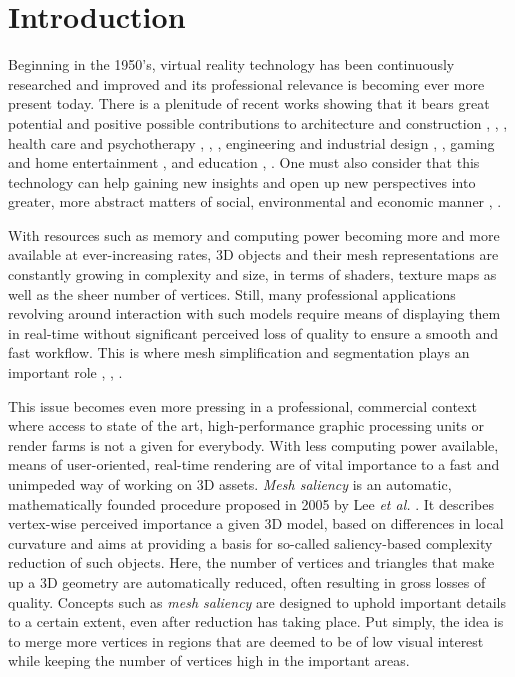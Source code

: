\chapter{Introduction}
\label{sec:introduction}

Beginning in the 1950's, virtual reality technology \cite{steuer1992defining} has been continuously researched and improved and its professional relevance is becoming ever more present today. There is a plenitude of recent works showing that it bears great potential and positive possible contributions to architecture and construction \cite{sampaio2014application}, \cite{le2015social}, \cite{stouffs2013happening}, health care and psychotherapy \cite{baus2014moving}, \cite{merians2014rehabilitation}, \cite{de2014healthcare}, engineering and industrial design \cite{marks2014towards}, \cite{wendrich2016hybrid}, gaming and home entertainment \cite{valente2016live}, \cite{zyda2005visual} and education \cite{merchant2014effectiveness}, \cite{ott2015literature}. One must also consider that this technology can help gaining new insights and open up new perspectives into greater, more abstract matters of social, environmental and economic manner \cite{ovtcharova2015innovation}, \cite{nguyen2016applying}. 

With resources such as memory and computing power becoming more and more available at ever-increasing rates, 3D objects and their mesh representations are constantly growing in complexity and size, in terms of shaders, texture maps as well as the sheer number of vertices. Still, many professional applications revolving around interaction with such models require means of displaying them in real-time without significant perceived loss of quality to ensure a smooth and fast workflow. This is where mesh simplification and segmentation plays an important role \cite{wei2010feature}, \cite{shaffer2001efficient}, \cite{zhao2012saliency}.

This issue becomes even more pressing in a professional, commercial context where access to state of the art, high-performance graphic processing units or render farms is not a given for everybody. With less computing power available, means of user-oriented, real-time rendering are of vital importance to a fast and unimpeded way of working on 3D assets. \textit{Mesh saliency} is an automatic, mathematically founded procedure proposed in 2005 by Lee \textit{et al.} \cite{lee2005mesh}. It describes vertex-wise perceived importance a given 3D model, based on differences in local curvature and aims at providing a basis for so-called saliency-based complexity reduction of such objects. Here, the number of vertices and triangles that make up a 3D geometry are automatically reduced, often resulting in gross losses of quality. Concepts such as \textit{mesh saliency} are designed to uphold important details to a certain extent, even after reduction has taking place. Put simply, the idea is to merge more vertices in regions that are deemed to be of low visual interest while keeping the number of vertices high in the important areas.

